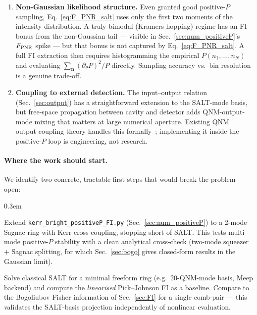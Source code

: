 \documentclass[11pt]{article}
\begin{document}
\begin{enumerate}
\item\textbf{Non-Gaussian likelihood structure.}  Even granted good
  positive-$P$ sampling, Eq.~\eqref{eq:F_PNR_salt} uses only the
  first two moments of the intensity distribution.  A truly bimodal
  (Kramers-hopping) regime has an FI bonus from the non-Gaussian tail
  --- visible in Sec.~\ref{sec:num_positiveP}'s $F_{\rm PNR}$ spike ---
  but that bonus is not captured by
  Eq.~\eqref{eq:F_PNR_salt}.  A full FI extraction then requires
  histogramming the empirical $P(n_1,\ldots,n_N)$ and evaluating
  $\sum_{\mathbf{n}}(\partial_\theta P)^2/P$ directly.  Sampling
  accuracy vs.\ bin resolution is a genuine trade-off.

\item\textbf{Coupling to external detection.}  The input--output
  relation (Sec.~\ref{sec:output}) has a straightforward extension to
  the SALT-mode basis, but free-space propagation between cavity and
  detector adds QNM-output-mode mixing that matters at large numerical
  aperture.  Existing QNM output-coupling theory handles this
  formally~\cite{LentrodtEvers2020,FrankeHughes2020}; implementing it
  inside the positive-$P$ loop is engineering, not research.

\end{enumerate}

\paragraph{Where the work should start.}
We identify two concrete, tractable first steps that would break the
problem open:

\begin{description}\itemsep0.3em
\item[\textbf{(P1)}] Extend \texttt{kerr\_bright\_positiveP\_FI.py}
  (Sec.~\ref{sec:num_positiveP}) to a 2-mode Sagnac ring with
  Kerr cross-coupling, stopping short of SALT.  This tests
  multi-mode positive-$P$ stability with a clean analytical
  cross-check (two-mode squeezer + Sagnac splitting, for which
  Sec.~\ref{sec:bogo} gives closed-form results in the Gaussian limit).
\item[\textbf{(P2)}] Solve classical SALT for a minimal freeform ring
  (e.g.\ 20-QNM-mode basis, Meep backend) and compute the
  \emph{linearised} Pick--Johnson FI as a baseline.  Compare to the
  Bogoliubov Fisher information of Sec.~\ref{sec:FI} for a single
  comb-pair --- this validates the SALT-basis projection independently
  of nonlinear evaluation.
\end{description}
\end{document}
